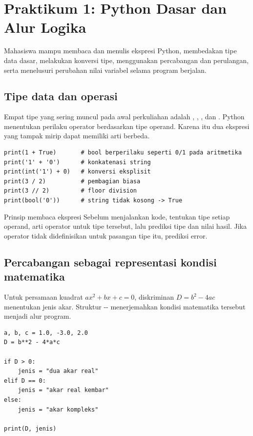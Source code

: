\documentclass[11pt,a4paper]{report}
\newcommand{\kode}[1]{\texttt{\detokenize{#1}}}
\begin{document}
\chapter{Praktikum 1: Python Dasar dan Alur Logika}
\begin{tujuanbox}
Mahasiswa mampu membaca dan menulis ekspresi Python, membedakan tipe data dasar, melakukan konversi tipe, menggunakan percabangan dan perulangan, serta menelusuri perubahan nilai variabel selama program berjalan.
\end{tujuanbox}

\section{Tipe data dan operasi}
Empat tipe yang sering muncul pada awal perkuliahan adalah \kode{int}, \kode{float}, \kode{bool}, dan \kode{str}. Python menentukan perilaku operator berdasarkan tipe operand. Karena itu dua ekspresi yang tampak mirip dapat memiliki arti berbeda.

\begin{lstlisting}
print(1 + True)       # bool berperilaku seperti 0/1 pada aritmetika
print('1' + '0')      # konkatenasi string
print(int('1') + 0)   # konversi eksplisit
print(3 / 2)          # pembagian biasa
print(3 // 2)         # floor division
print(bool('0'))      # string tidak kosong -> True
\end{lstlisting}

\begin{idebox}{Prinsip membaca ekspresi}
Sebelum menjalankan kode, tentukan tipe setiap operand, arti operator untuk tipe tersebut, lalu prediksi tipe dan nilai hasil. Jika operator tidak didefinisikan untuk pasangan tipe itu, prediksi error.
\end{idebox}

\section{Percabangan sebagai representasi kondisi matematika}
Untuk persamaan kuadrat $ax^2+bx+c=0$, diskriminan $D=b^2-4ac$ menentukan jenis akar. Struktur \kode{if}-\kode{elif}-\kode{else} menerjemahkan kondisi matematika tersebut menjadi alur program.

\begin{lstlisting}
a, b, c = 1.0, -3.0, 2.0
D = b**2 - 4*a*c

if D > 0:
    jenis = "dua akar real"
elif D == 0:
    jenis = "akar real kembar"
else:
    jenis = "akar kompleks"

print(D, jenis)
\end{lstlisting}
\end{document}
